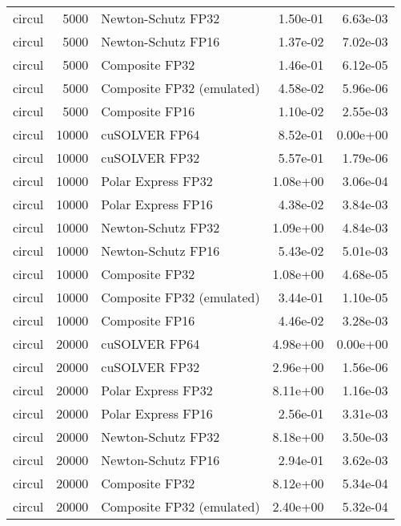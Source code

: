 \begin{table}
\begin{tabular}{lrlrr}
   circul &  5000 &        Newton-Schutz FP32 &  1.50e-01 &        6.63e-03 \\
   circul &  5000 &        Newton-Schutz FP16 &  1.37e-02 &        7.02e-03 \\
   circul &  5000 &            Composite FP32 &  1.46e-01 &        6.12e-05 \\
   circul &  5000 & Composite FP32 (emulated) &  4.58e-02 &        5.96e-06 \\
   circul &  5000 &            Composite FP16 &  1.10e-02 &        2.55e-03 \\
   circul & 10000 &             cuSOLVER FP64 &  8.52e-01 &        0.00e+00 \\
   circul & 10000 &             cuSOLVER FP32 &  5.57e-01 &        1.79e-06 \\
   circul & 10000 &        Polar Express FP32 &  1.08e+00 &        3.06e-04 \\
   circul & 10000 &        Polar Express FP16 &  4.38e-02 &        3.84e-03 \\
   circul & 10000 &        Newton-Schutz FP32 &  1.09e+00 &        4.84e-03 \\
   circul & 10000 &        Newton-Schutz FP16 &  5.43e-02 &        5.01e-03 \\
   circul & 10000 &            Composite FP32 &  1.08e+00 &        4.68e-05 \\
   circul & 10000 & Composite FP32 (emulated) &  3.44e-01 &        1.10e-05 \\
   circul & 10000 &            Composite FP16 &  4.46e-02 &        3.28e-03 \\
   circul & 20000 &             cuSOLVER FP64 &  4.98e+00 &        0.00e+00 \\
   circul & 20000 &             cuSOLVER FP32 &  2.96e+00 &        1.56e-06 \\
   circul & 20000 &        Polar Express FP32 &  8.11e+00 &        1.16e-03 \\
   circul & 20000 &        Polar Express FP16 &  2.56e-01 &        3.31e-03 \\
   circul & 20000 &        Newton-Schutz FP32 &  8.18e+00 &        3.50e-03 \\
   circul & 20000 &        Newton-Schutz FP16 &  2.94e-01 &        3.62e-03 \\
   circul & 20000 &            Composite FP32 &  8.12e+00 &        5.34e-04 \\
   circul & 20000 & Composite FP32 (emulated) &  2.40e+00 &        5.32e-04 \\

\end{tabular}
\end{table}
